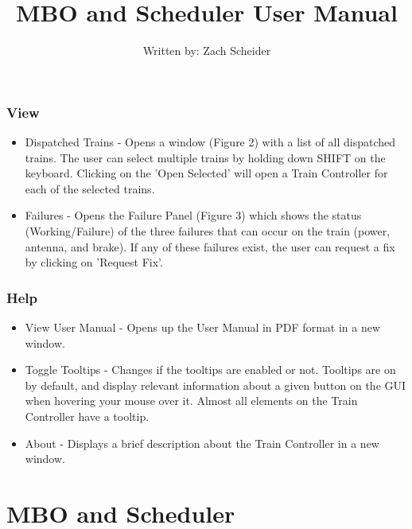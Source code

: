 \documentclass[letterpaper]{article}
\begin{document}
\subsubsection{View}
	\begin{itemize}
		\item Dispatched Trains - Opens a window (Figure 2) with a list of all dispatched trains. The user can select multiple trains by holding down SHIFT on the keyboard. Clicking on the 'Open Selected' will open a Train Controller for each of the selected trains.  
		\item Failures - Opens the Failure Panel (Figure 3) which shows the status (Working/Failure) of the three failures that can occur on the train (power, antenna, and brake). If any of these failures exist, the user can request a fix by clicking on 'Request Fix'. 
	\end{itemize}
	 
\subsubsection{Help}
	\begin{itemize}
		\item View User Manual - Opens up the User Manual in PDF format in a new window. 
		\item Toggle Tooltips - Changes if the tooltips are enabled or not. Tooltips are on by default, and display relevant information about a given button on the GUI when hovering your mouse over it. Almost all elements on the Train Controller have a tooltip. 
		\item About - Displays a brief description about the Train Controller in a new window.
	\end{itemize}

\newpage

\begin{center}
	\Large
	\title{MBO and Scheduler User Manual \\}
	\author{Written by: Zach Scheider}
	\date{}
\end{center}

\maketitle


\section{MBO and Scheduler}
\end{document}
